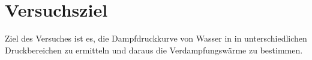 \section{Versuchsziel}
\label{sec:Versuchsziel}

Ziel des Versuches ist es, die Dampfdruckkurve von Wasser in in unterschiedlichen Druckbereichen zu ermitteln und daraus die Verdampfungswärme zu bestimmen.